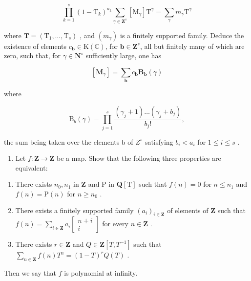 \[
\prod_ {k = 1} ^ {s} (1 - \mathrm{T} _ {k}) ^ {a _ {k}} \sum_ {\gamma \in \mathbf {Z} ^ {s}} [ \mathrm{M} _ {\gamma} ] \mathrm{T} ^ {\gamma} = \sum_ {\gamma} m _ {\gamma} \mathrm{T} ^ {\gamma}
\]

where \(\mathbf{T} = (\mathrm{T}_{1},\dots,\mathrm{T}_{s})\) , and \((m_{\gamma})\) is a finitely supported family. Deduce the existence of elements \(c_{\boldsymbol{b}}\in\mathrm{K}(\mathbb{C})\), for \(\boldsymbol{b}\in\mathbf{Z}^{s}\), all but finitely many of which are zero, such that, for \(\gamma\in\mathbf{N}^{s}\) sufficiently large, one has

\[
[ \mathbf {M} _ {\gamma} ] = \sum_ {\boldsymbol {b}} c _ {\boldsymbol {b}} \mathbf {B} _ {\boldsymbol {b}} (\gamma)
\]

where

\[
\mathrm{B} _ {b} (\gamma) = \prod_ {j = 1} ^ {s} \frac {(\gamma_ {j} + 1) \dots (\gamma_ {j} + b _ {j})}{b _ {j} !},
\]

the sum being taken over the elements b of \(Z^{s}\) satisfying \(b_{i} < a_{i}\) for \(1 \leqslant i \leqslant s\) .

\begin{enumerate}
\def\labelenumi{\arabic{enumi})}
\setcounter{enumi}{1}
\tightlist
\item
  Let \(f: \mathbf{Z} \to \mathbf{Z}\) be a map. Show that the following three properties are equivalent:
\end{enumerate}

\begin{enumerate}
\def\labelenumi{\alph{enumi})}
\item
  There exists \(n_0, n_1\) in \(\mathbf{Z}\) and \(\mathrm{P}\) in \(\mathbf{Q}[\mathrm{T}]\) such that \(f(n) = 0\) for \(n \leqslant n_1\) and \(f(n) = \mathrm{P}(n)\) for \(n \geqslant n_0\) .
\item
  There exists a finitely supported family \((a_i)_{i\in \mathbf{Z}}\) of elements of \(\mathbf{Z}\) such that \(f(n) = \sum_{i\in \mathbf{Z}}a_i\left[ \begin{array}{cc}n + i\\ i \end{array} \right]\) for every \(n\in \mathbf{Z}\) .
\item
  There exists \(r \in \mathbf{Z}\) and \(Q \in \mathbf{Z}[T, T^{-1}]\) such that \(\sum_{n \in \mathbf{Z}} f(n) T^n = (1 - T)^r Q(T)\) .
\end{enumerate}

Then we say that \(f\) is polynomial at infinity.

